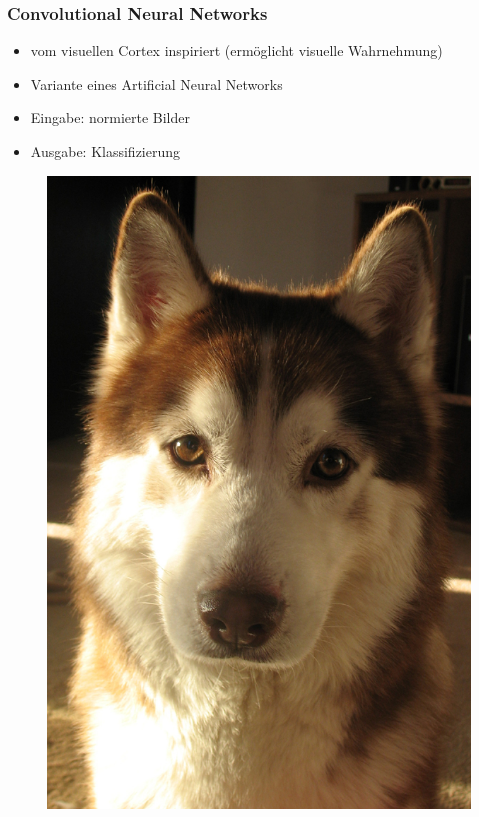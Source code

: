 \documentclass[12pt,utf8]{beamer}
\begin{document}
	\begin{frame}
		\frametitle{Convolutional Neural Networks}
		\begin{itemize}
			\item vom visuellen Cortex inspiriert (ermöglicht visuelle Wahrnehmung)
			\item Variante eines Artificial Neural Networks
			\item Eingabe: normierte Bilder
			\item Ausgabe: Klassifizierung
		\end{itemize}
	\end{frame}
	
	\begin{frame}
		\begin{figure}
			\centering
			\includegraphics[scale=0.2]{resources/doggo.jpg}

\end{figure}
\end{frame}
\end{document}
